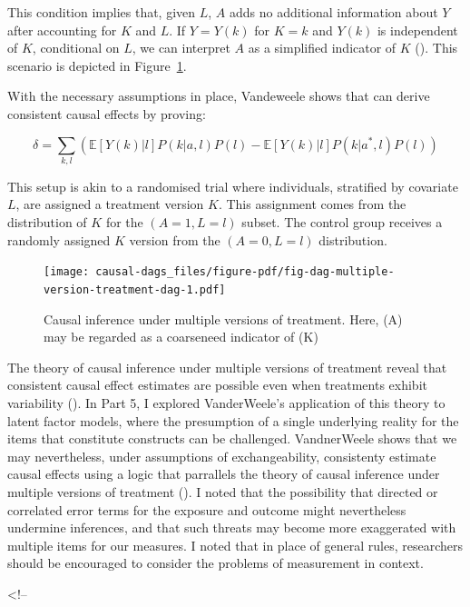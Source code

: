 \documentclass[
  singlecolumn,
  9pt]{article}
\begin{document}
This condition implies that, given \(L\), \(A\) adds no additional
information about \(Y\) after accounting for \(K\) and \(L\). If
\(Y = Y(k)\) for \(K = k\) and \(Y(k)\) is independent of \(K\),
conditional on \(L\), we can interpret \(A\) as a simplified indicator
of \(K\) ().
This scenario is depicted in
Figure~\ref{fig-dag-multiple-version-treatment-dag}.

With the necessary assumptions in place, Vandeweele shows that can
derive consistent causal effects by proving:

\[\delta = \sum_{k,l} \left( \mathbb{E}[Y(k)|l] P(k|a,l) P(l) - \mathbb{E}[Y(k)|l] P(k|a^*,l) P(l) \right) \]

This setup is akin to a randomised trial where individuals, stratified
by covariate \(L\), are assigned a treatment version \(K\). This
assignment comes from the distribution of \(K\) for the
\((A = 1, L = l)\) subset. The control group receives a randomly
assigned \(K\) version from the \((A = 0, L = l)\) distribution.

\begin{figure}

{\centering \texttt{[image: causal-dags\_files/figure-pdf/fig-dag-multiple-version-treatment-dag-1.pdf]}

}

\caption{\label{fig-dag-multiple-version-treatment-dag}Causal inference
under multiple versions of treatment. Here, (A) may be regarded as a
coarseneed indicator of (K)}

\end{figure}

The theory of causal inference under multiple versions of treatment
reveal that consistent causal effect estimates are possible even when
treatments exhibit variability
(). In Part
5, I explored VanderWeele's application of this theory to latent factor
models, where the presumption of a single underlying reality for the
items that constitute constructs can be challenged. VandnerWeele shows
that we may nevertheless, under assumptions of exchangeability,
consistenty estimate causal effects using a logic that parrallels the
theory of causal inference under multiple versions of treatment
(). I noted that the
possibility that directed or correlated error terms for the exposure and
outcome might nevertheless undermine inferences, and that such threats
may become more exaggerated with multiple items for our measures. I
noted that in place of general rules, researchers should be encouraged
to consider the problems of measurement in context.

\textless!--
\end{document}
